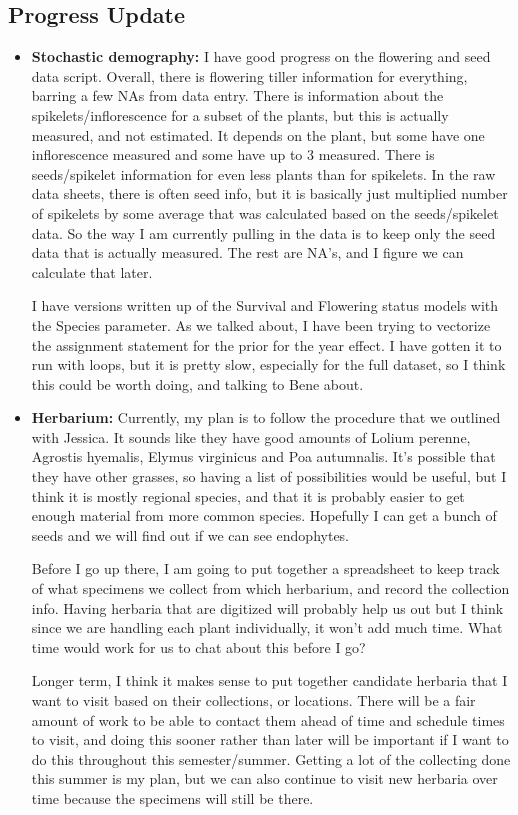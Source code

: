 \documentclass{article}
\begin{document}
\subsection*{Progress Update}
\begin{itemize}
\item{\textbf{Stochastic demography:}
I have good progress on the flowering and seed data script. Overall, there is flowering tiller information for everything, barring a few NAs from data entry. There is information about the spikelets/inflorescence for a subset of the plants, but this is actually measured, and not estimated. It depends on the plant, but some have one inflorescence measured and some have up to 3 measured. There is seeds/spikelet information for even less plants than for spikelets. In the raw data sheets, there is often seed info, but it is basically just multiplied number of spikelets by some average that was calculated based on the seeds/spikelet data. So the way I am currently pulling in the data is to keep only the seed data that is actually measured. The rest are NA's, and I figure we can calculate that later. 

I have versions written up of the Survival and Flowering status models with the Species parameter. As we talked about, I have been trying to vectorize the  assignment statement for the prior for the year effect. I have gotten it to run with loops, but it is pretty slow, especially for the full dataset, so I think this could be worth doing, and talking to Bene about.
}

\item{\textbf{Herbarium:}
Currently, my plan is to follow the procedure that we outlined with Jessica. It sounds like they have good amounts of Lolium perenne, Agrostis hyemalis,  Elymus virginicus and Poa autumnalis. It's possible that they have other grasses, so having a list of possibilities would be useful, but I think it is mostly regional species, and that it is probably easier to get enough material from more common species. Hopefully I can get a bunch of seeds and we will find out if we can see endophytes. 

Before I go up there, I am going to put together a spreadsheet to keep track of what specimens we collect from which herbarium, and record the collection info. Having herbaria that are digitized will probably help us out but I think since we are handling each plant individually, it won't add much time. What time would work for us to chat about this before I go?

Longer term, I think it makes sense to put together candidate herbaria that I want to visit based on their collections, or locations. There will be a fair amount of work to be able to contact them ahead of time and schedule times to visit, and doing this sooner rather than later will be important if I want to do this throughout this semester/summer. Getting a lot of the collecting done this summer is my plan, but we can also continue to visit new herbaria over time because the specimens will still be there.  

}
\end{itemize}
\end{document}

